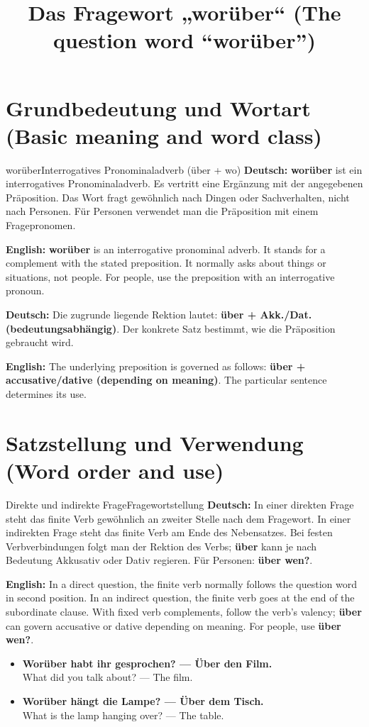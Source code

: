 \documentclass[a4paper,11pt]{article}
\title{Das Fragewort „worüber“ (The question word “worüber”)}
\date{}
\newcommand{\GermanText}[1]{\textbf{Deutsch: }#1\par}
\newcommand{\EnglishText}[1]{{\small\color{SoftGray}\textbf{English: }#1\par}}
\newcommand{\ExampleItem}[2]{\item \textbf{#1}\\{\small\color{SoftGray}#2}}
\begin{document}
\maketitle
\tableofcontents
\newpage
\section{Grundbedeutung und Wortart (Basic meaning and word class)}
\begin{grammarentry}{worüber}{Interrogatives Pronominaladverb (über + wo)}
\GermanText{\textbf{worüber} ist ein interrogatives Pronominaladverb. Es vertritt eine Ergänzung mit der angegebenen Präposition. Das Wort fragt gewöhnlich nach Dingen oder Sachverhalten, nicht nach Personen. Für Personen verwendet man die Präposition mit einem Fragepronomen.}
\EnglishText{\textbf{worüber} is an interrogative pronominal adverb. It stands for a complement with the stated preposition. It normally asks about things or situations, not people. For people, use the preposition with an interrogative pronoun.}
\GermanText{Die zugrunde liegende Rektion lautet: \textbf{über + Akk./Dat. (bedeutungsabhängig)}. Der konkrete Satz bestimmt, wie die Präposition gebraucht wird.}
\EnglishText{The underlying preposition is governed as follows: \textbf{über + accusative/dative (depending on meaning)}. The particular sentence determines its use.}
\end{grammarentry}
\section{Satzstellung und Verwendung (Word order and use)}
\begin{grammarentry}{Direkte und indirekte Frage}{Fragewortstellung}
\GermanText{In einer direkten Frage steht das finite Verb gewöhnlich an zweiter Stelle nach dem Fragewort. In einer indirekten Frage steht das finite Verb am Ende des Nebensatzes. Bei festen Verbverbindungen folgt man der Rektion des Verbs; \textbf{über} kann je nach Bedeutung Akkusativ oder Dativ regieren. Für Personen: \textbf{über wen?}.}
\EnglishText{In a direct question, the finite verb normally follows the question word in second position. In an indirect question, the finite verb goes at the end of the subordinate clause. With fixed verb complements, follow the verb's valency; \textbf{über} can govern accusative or dative depending on meaning. For people, use \textbf{über wen?}.}
\end{grammarentry}
\begin{exbox}\begin{itemize}
\ExampleItem{Worüber habt ihr gesprochen? — Über den Film.}{What did you talk about? — The film.}
\ExampleItem{Worüber hängt die Lampe? — Über dem Tisch.}{What is the lamp hanging over? — The table.}
\end{itemize}\end{exbox}
\end{document}
